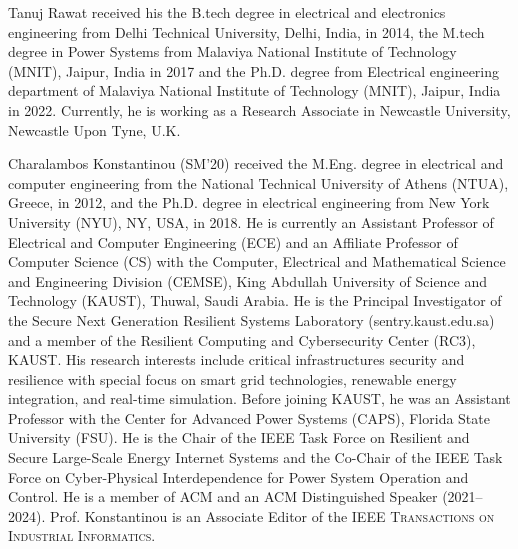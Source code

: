 \documentclass[journal]{IEEEtran}
\begin{document}
\begin{IEEEbiography}[{
		\texttt{[image: \{./GTIBDRPicx/Tanuj.jpg]}}}
	]{Tanuj Rawat} received his the B.tech degree in electrical and electronics engineering from Delhi Technical University, Delhi, India, in 2014, the M.tech degree in Power Systems from Malaviya National Institute of Technology (MNIT), Jaipur, India in 2017 and the Ph.D. degree from Electrical engineering department of Malaviya National Institute of Technology (MNIT), Jaipur, India in 2022. Currently, he is working as a Research Associate in Newcastle University, Newcastle Upon Tyne, U.K.   
\end{IEEEbiography}

\begin{IEEEbiography}[{
		\texttt{[image: \{./GTIBDRPicx/konstantinou.png]}}}
	]{Charalambos Konstantinou} (SM'20) received the M.Eng. degree in electrical and computer engineering from the National Technical University of Athens (NTUA), Greece, in 2012, and the Ph.D. degree in electrical engineering from New York University (NYU), NY, USA, in 2018. He is currently an Assistant Professor of Electrical and Computer Engineering (ECE) and an Affiliate Professor of Computer Science (CS) with the Computer, Electrical and Mathematical Science and Engineering Division (CEMSE), King Abdullah University of Science and Technology (KAUST), Thuwal, Saudi Arabia. He is the Principal Investigator of the Secure Next Generation Resilient Systems Laboratory (sentry.kaust.edu.sa) and a member of the Resilient Computing and Cybersecurity Center (RC3), KAUST. His research interests include critical infrastructures security and resilience with special focus on smart grid technologies, renewable energy integration, and real-time simulation. Before joining KAUST, he was an Assistant Professor with the Center for Advanced Power Systems (CAPS), Florida State University (FSU). He is the Chair of the IEEE Task Force on Resilient and Secure Large-Scale Energy Internet Systems and the Co-Chair of the IEEE Task Force on Cyber-Physical Interdependence for Power System Operation and Control. He is a member of ACM and an ACM Distinguished Speaker (2021–2024). Prof. Konstantinou is an Associate Editor of the IEEE \textsc{Transactions on Industrial Informatics}.
\end{IEEEbiography}


\fi
\end{document}
